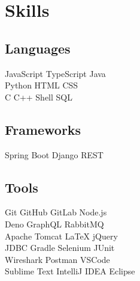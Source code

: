 \documentclass[]{deedy-resume-openfont}
\begin{document}
%
%
\lastupdated

%
%

%
%

\begin{minipage}[t]{0.33\textwidth} 


\section{Skills}
\subsection{Languages}
JavaScript \textbullet{} TypeScript \textbullet Java \\ 
\textbullet{} Python \textbullet{} HTML \textbullet{} CSS \\ 
\textbullet{} C \textbullet{} C++ \textbullet{} Shell \textbullet{} SQL \\

\subsection{Frameworks}
Spring Boot \textbullet{} Django REST\\

\subsection{Tools}
Git \textbullet{} GitHub  \textbullet{} GitLab  \textbullet{} Node.js \\
\textbullet{} Deno \textbullet{} GraphQL \textbullet{} RabbitMQ\\
\textbullet{} Apache Tomcat \textbullet{} LaTeX \textbullet{} jQuery \\
\textbullet{} JDBC \textbullet{} Gradle \textbullet{} Selenium \textbullet{} JUnit  \\ 
\textbullet{} Wireshark \textbullet{} Postman \textbullet{} VSCode \\
\textbullet{} Sublime Text \textbullet{} IntelliJ IDEA \textbullet{} Eclipse 
\sectionsep


\end{minipage}
\end{document}
